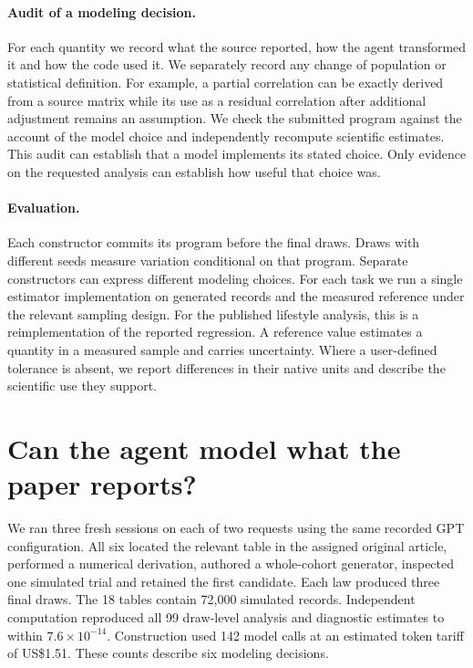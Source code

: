 \documentclass[sigconf,anonymous,review]{acmart}
\begin{document}
\paragraph{Audit of a modeling decision.}
For each quantity we record what the source reported, how the agent transformed it and how the code used it. We separately record any change of population or statistical definition. For example, a partial correlation can be exactly derived from a source matrix while its use as a residual correlation after additional adjustment remains an assumption. We check the submitted program against the account of the model choice and independently recompute scientific estimates. This audit can establish that a model implements its stated choice. Only evidence on the requested analysis can establish how useful that choice was.

\paragraph{Evaluation.}
Each constructor commits its program before the final draws. Draws with different seeds measure variation conditional on that program. Separate constructors can express different modeling choices. For each task we run a single estimator implementation on generated records and the measured reference under the relevant sampling design. For the published lifestyle analysis, this is a reimplementation of the reported regression. A reference value estimates a quantity in a measured sample and carries uncertainty. Where a user-defined tolerance is absent, we report differences in their native units and describe the scientific use they support.

\section{Can the agent model what the paper reports?}
\label{sec:original}
We ran three fresh sessions on each of two requests using the same recorded GPT configuration. All six located the relevant table in the assigned original article, performed a numerical derivation, authored a whole-cohort generator, inspected one simulated trial and retained the first candidate. Each law produced three final draws. The 18 tables contain 72,000 simulated records. Independent computation reproduced all 99 draw-level analysis and diagnostic estimates to within $7.6\times10^{-14}$. Construction used 142 model calls at an estimated token tariff of US\$1.51. These counts describe six modeling decisions.
\end{document}
